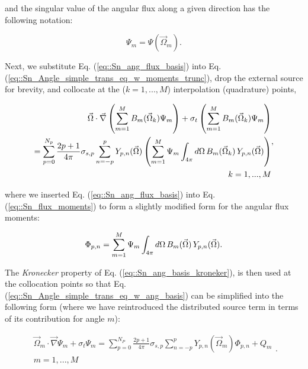 \noindent and the singular value of the angular flux along a given direction has the following notation:

\begin{equation}
\label{eq::Sn_ang_flux_identity}
\Psi_m = \Psi (\vec{\Omega}_m).
\end{equation}

Next, we substitute Eq. (\ref{eq::Sn_ang_flux_basis}) into Eq. (\ref{eq::Sn_Angle_simple_trans_eq_w_moments_trunc}), drop the external source for brevity, and collocate at the ($k=1,...,M$) interpolation (quadrature) points,

\begin{equation}
\label{eq::Sn_Angle_simple_trans_eq_w_ang_basis}
\begin{aligned}
\vec{\Omega} \cdot \vec{\nabla} \left( \sum\displaylimits_{m=1}^{M} B_m (\vec{\Omega}_k)  \Psi_m \right) + \sigma_t \left(  \sum\displaylimits_{m=1}^{M} B_m (\vec{\Omega}_k)  \Psi_m \right) \\
= \sum_{p=0}^{N_p} \frac{2p + 1}{4 \pi} \sigma_{s,p}   \sum_{n=-p}^{p}   Y_{p,n} (  \vec{\Omega} ) \left(  \sum\displaylimits_{m=1}^M \Psi_m \int_{4 \pi} d\Omega \, B_m (\vec{\Omega}_k)  \, Y_{p,n} (\vec{\Omega})  \right)  \\
k=1,...,M
\end{aligned} ,
\end{equation}

\noindent where we inserted Eq. (\ref{eq::Sn_ang_flux_basis}) into Eq. (\ref{eq::Sn_flux_moments}) to form a slightly modified form for the angular flux moments:

\begin{equation}
\label{eq::Sn_flux_mom_int_w_basis}
\Phi_{p,n} = \sum\displaylimits_{m=1}^M \Psi_m \int_{4 \pi} d\Omega \, B_m (\vec{\Omega})  \, Y_{p,n} (\vec{\Omega}).
\end{equation}

\noindent The {\em Kronecker} property of Eq. (\ref{eq::Sn_ang_basis_kroneker}), is then used at the collocation points so that Eq. (\ref{eq::Sn_Angle_simple_trans_eq_w_ang_basis}) can be simplified into the following form (where we have reintroduced the distributed source term in terms of its contribution for angle $m$):

\begin{equation}
\label{eq::Sn_trans_eq_angle_disc_FINAL}
\begin{aligned}
\vec{\Omega}_m \cdot \vec{\nabla} \Psi_{m}  + \sigma_{t}   \Psi_{m}=  \sum_{p=0}^{N_P} \frac{2p + 1}{4 \pi}  \sigma_{s,p}  \sum_{n=-p}^{p}  Y_{p,n} (  \vec{\Omega}_m )  \Phi_{p,n}  + Q_{m}  \\
m=1,...,M
\end{aligned} .
\end{equation}

